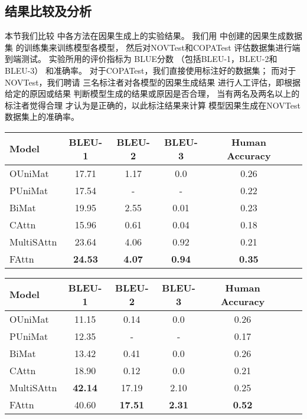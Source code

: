 \begin{itemize}
\subsection{结果比较及分析}
\label{sec:causalgen-results}
本节我们比较
中各方法在因果生成上的实验结果。
我们用
中创建的因果生成数据集
的训练集来训练模型各模型，
然后对NOVTest和COPATest
评估数据集进行端到端测试。
实验所用的评价指标为
BLUE分数
（包括BLEU-1，BLEU-2和BLEU-3）
和准确率。
对于COPATest，我们直接使用标注好的数据集；
而对于NOVTest，我们聘请
三名标注者对各模型的因果生成结果
进行人工评估，即根据给定的原因或结果
判断模型生成的结果或原因是否合理，
当有两名及两名以上的标注者觉得合理
才认为是正确的，以此标注结果来计算
模型因果生成在NOVTest数据集上的准确率。

\begin{table}[th]
	\centering
	\begin{tabular}{lccccc}
		\hline
		Model &   BLEU-1  & BLEU-2 & BLEU-3 & Human Accuracy \\
		\hline
		OUniMat   & 17.71  & 1.17  & 0.0  &  0.26  \\
		PUniMat   &  17.54 &  - & -  &  0.22   \\
		BiMat        & 19.95  &  2.55 & 0.01  &  0.23  \\
		CAttn  & 15.96 & 0.61 & 0.04 & 0.18 \\
		MultiSAttn & 23.64 & 4.06 & 0.92 & 0.21 \\
		FAttn & \bf 24.53 & \bf 4.07 & \bf 0.94 & \bf 0.35 \\
		\hline
	\end{tabular}
	\label{tab:causalgen-novel-eval}
\end{table}


\begin{table}[th]
	\centering
	\begin{tabular}{lcccccc}
		\hline
		Model &   BLEU-1 & BLEU-2 & BLEU-3 & Human Accuracy \\	\hline
		OUniMat & 11.15 & 0.14 & 0.0 & 0.26 \\
		PUniMat & 12.35 & -  & - & 0.17 \\
		BiMat & 13.42 & 0.41 & 0.0 & 0.26 \\
		CAttn & 18.90 & 0.12 & 0.0 & 0.21 \\
		MultiSAttn & \bf 42.14 & 17.19 & 2.10 & 0.25 \\
		FAttn & 40.60 & \bf 17.51 & \bf 2.31 & \bf 0.52 \\\hline
	\end{tabular}
	\label{tab:causalgen-copa-eval}
\end{table}


\end{itemize}
